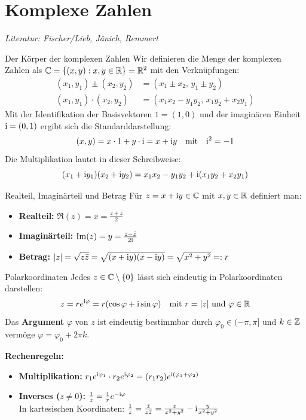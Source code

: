 \section{Komplexe Zahlen}

\textit{Literatur: Fischer/Lieb, Jänich, Remmert}

\begin{defi}{Der Körper der komplexen Zahlen}
Wir definieren die Menge der komplexen Zahlen als $\mathbb{C} = \{ (x,y) : x,y \in \mathbb{R} \} = \mathbb{R}^2$ mit den Verknüpfungen:
\begin{align*}
    (x_1, y_1) \pm (x_2, y_2) &= (x_1 \pm x_2, \, y_1 \pm y_2) \\
    (x_1, y_1) \cdot (x_2, y_2) &= (x_1 x_2 - y_1 y_2, \, x_1 y_2 + x_2 y_1)
\end{align*}
Mit der Identifikation der Basisvektoren $1 = (1,0)$ und der imaginären Einheit $\mathrm{i} = (0,1)$ ergibt sich die Standarddarstellung:
\[
    (x,y) = x \cdot 1 + y \cdot \mathrm{i} = x + \mathrm{i} y \quad \text{mit} \quad \mathrm{i}^2 = -1
\]
Die Multiplikation lautet in dieser Schreibweise:
\[
    (x_1 + \mathrm{i} y_1)(x_2 + \mathrm{i} y_2) = x_1 x_2 - y_1 y_2 + \mathrm{i}(x_1 y_2 + x_2 y_1)
\]
\end{defi}

\begin{defi}{Realteil, Imaginärteil und Betrag}
Für $z = x + \mathrm{i} y \in \mathbb{C}$ mit $x,y \in \mathbb{R}$ definiert man:
\begin{itemize}
    \item \textbf{Realteil:} $\Re(z) = x = \frac{z + \bar{z}}{2}$
    \item \textbf{Imaginärteil:} $\operatorname{Im}(z) = y = \frac{z - \bar{z}}{2\mathrm{i}}$
    \item \textbf{Betrag:} $|z| = \sqrt{z\bar{z}} = \sqrt{(x+\mathrm{i} y)(x-\mathrm{i} y)} = \sqrt{x^2 + y^2} =: r$
\end{itemize}
\end{defi}

\begin{defi}{Polarkoordinaten}
Jedes $z \in \mathbb{C} \setminus \{0\}$ lässt sich eindeutig in Polarkoordinaten darstellen:
\[
    z = r e^{\mathrm{i}\varphi} = r(\cos\varphi + \mathrm{i}\sin\varphi) \quad \text{mit } r = |z| \text{ und } \varphi \in \mathbb{R}
\]
Das \textbf{Argument} $\varphi$ von $z$ ist eindeutig bestimmbar durch $\varphi_0 \in (-\pi, \pi]$ und $k \in \mathbb{Z}$ vermöge $\varphi = \varphi_0 + 2\pi k$.

\textbf{Rechenregeln:}
\begin{itemize}
    \item \textbf{Multiplikation:} $r_1 e^{\mathrm{i}\varphi_1} \cdot r_2 e^{\mathrm{i}\varphi_2} = (r_1 r_2) e^{\mathrm{i}(\varphi_1 + \varphi_2)}$
    \item \textbf{Inverses ($z \neq 0$):} $\frac{1}{z} = \frac{1}{r} e^{-\mathrm{i}\varphi}$ \\
    In kartesischen Koordinaten: $\frac{1}{z} = \frac{\bar{z}}{z\bar{z}} = \frac{x}{x^2+y^2} - \mathrm{i} \frac{y}{x^2+y^2}$
\end{itemize}
\end{defi}

